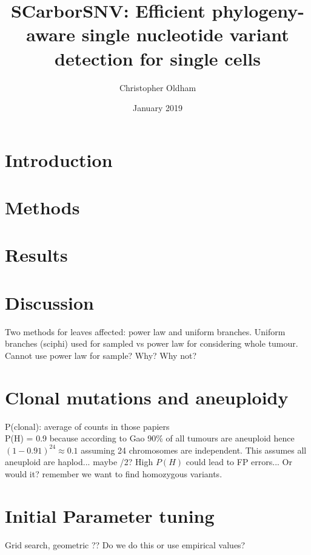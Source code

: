 \documentclass{article}
\title{SCarborSNV: Efficient phylogeny-aware single nucleotide variant detection for single cells}
\author{Christopher Oldham}
\date{January 2019}
\begin{document}
\maketitle


\section{Introduction}
%

\section{Methods}


\section{Results}
\section{Discussion}

Two methods for leaves affected: power law and uniform branches. Uniform branches (sciphi) used for sampled vs power law for considering whole tumour. Cannot use power law for sample? Why? Why not?









\newpage
{}
%


\newpage
\appendix
\section{Clonal mutations and aneuploidy}
P(clonal): average of counts in those papiers\\
P(H) = 0.9 because according to Gao 90\% of all tumours are aneuploid hence $(1-0.91)^{24}\approx 0.1$ assuming 24 chromosomes are independent. This assumes all aneuploid are haplod... maybe /2? High $P(H)$ could lead to FP errors... Or would it? remember we want to find homozygous variants.
\section{Initial Parameter tuning}
Grid search, geometric ?? Do we do this or use empirical values?
\end{document}
